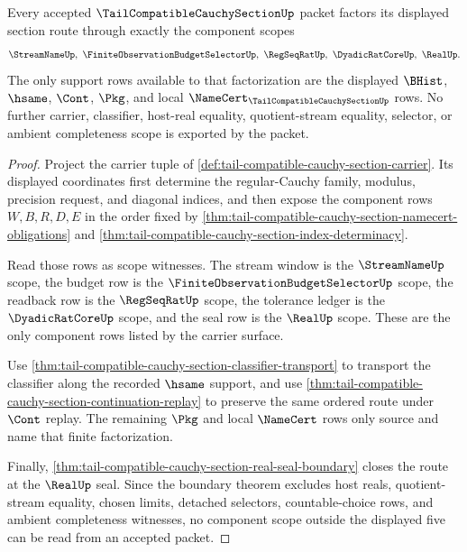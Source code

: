 \begin{theorem}
\label{thm:tail-compatible-cauchy-section-component-scope-binding}
Every accepted $\TailCompatibleCauchySectionUp$ packet factors its displayed section route through exactly the component scopes
$$
\StreamNameUp,\ \FiniteObservationBudgetSelectorUp,\ \RegSeqRatUp,\ \DyadicRatCoreUp,\ \RealUp.
$$
The only support rows available to that factorization are the displayed $\BHist$, $\hsame$, $\Cont$, $\Pkg$, and local $\NameCert_{\TailCompatibleCauchySectionUp}$ rows. No further carrier, classifier, host-real equality, quotient-stream equality, selector, or ambient completeness scope is exported by the packet.
\end{theorem}
\begin{proof}
Project the carrier tuple of \autoref{def:tail-compatible-cauchy-section-carrier}. Its displayed coordinates first determine the regular-Cauchy family, modulus, precision request, and diagonal indices, and then expose the component rows $W,B,R,D,E$ in the order fixed by \autoref{thm:tail-compatible-cauchy-section-namecert-obligations} and \autoref{thm:tail-compatible-cauchy-section-index-determinacy}.

Read those rows as scope witnesses. The stream window is the $\StreamNameUp$ scope, the budget row is the $\FiniteObservationBudgetSelectorUp$ scope, the readback row is the $\RegSeqRatUp$ scope, the tolerance ledger is the $\DyadicRatCoreUp$ scope, and the seal row is the $\RealUp$ scope. These are the only component rows listed by the carrier surface.

Use \autoref{thm:tail-compatible-cauchy-section-classifier-transport} to transport the classifier along the recorded $\hsame$ support, and use \autoref{thm:tail-compatible-cauchy-section-continuation-replay} to preserve the same ordered route under $\Cont$ replay. The remaining $\Pkg$ and local $\NameCert$ rows only source and name that finite factorization.

Finally, \autoref{thm:tail-compatible-cauchy-section-real-seal-boundary} closes the route at the $\RealUp$ seal. Since the boundary theorem excludes host reals, quotient-stream equality, chosen limits, detached selectors, countable-choice rows, and ambient completeness witnesses, no component scope outside the displayed five can be read from an accepted packet.
\end{proof}

